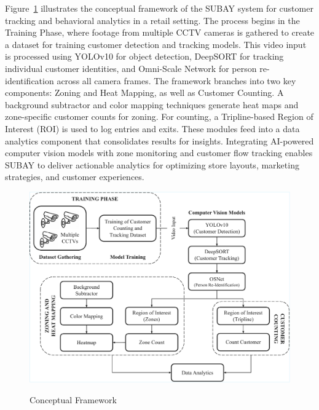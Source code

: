 {Figure~\ref{fig:2.1} illustrates the conceptual framework of the SUBAY system for customer tracking and behavioral analytics in a retail setting. The process begins in the Training Phase, where footage from multiple CCTV cameras is gathered to create a dataset for training customer detection and tracking models. This video input is processed using YOLOv10 for object detection, DeepSORT for tracking individual customer identities, and Omni-Scale Network for person re-identification across all camera frames. The framework branches into two key components: Zoning and Heat Mapping, as well as Customer Counting. A background subtractor and color mapping techniques generate heat maps and zone-specific customer counts for zoning. For counting, a Tripline-based Region of Interest (ROI) is used to log entries and exits. These modules feed into a data analytics component that consolidates results for insights. Integrating AI-powered computer vision models with zone monitoring and customer flow tracking enables SUBAY to deliver actionable analytics for optimizing store layouts, marketing strategies, and customer experiences.

\begin{figure}[H]
	\caption[Conceptual Framework]{\newline \newline Conceptual Framework}
	\centering
	\includegraphics[width=0.85\linewidth]{fig/2.1.pdf}
	\label{fig:2.1}
\end{figure}

}